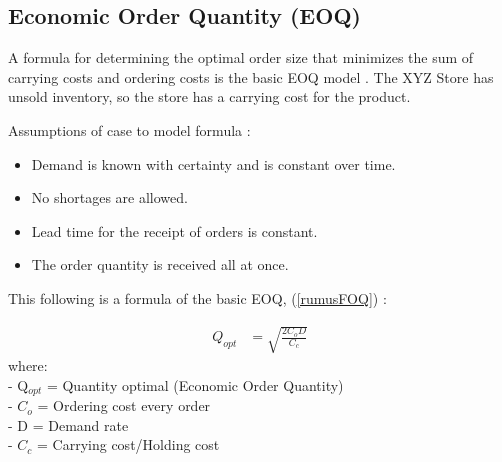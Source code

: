 \documentclass[12pt,a4paper,final]{iopart}
\begin{document}


\subsection{Economic Order Quantity (EOQ)}
A formula for determining the optimal order size that minimizes the sum of carrying costs and ordering costs is the basic EOQ model \cite{Rusell2011}. The XYZ Store has unsold inventory, so the store has a carrying cost for the product.

Assumptions of case to model formula \cite{Rusell2011}: 
\begin{itemize}
	\item Demand is known with certainty and is constant over time.
	\item No shortages are allowed.
	\item Lead time for the receipt of orders is constant.
	\item The order quantity is received all at once.
\end{itemize}
This following is a formula of the basic EOQ, (\ref{rumusFOQ}) :

\begin{eqnarray}
	\label{rumusFOQ}
	Q_{opt} &= \sqrt{\frac{2C_oD}{C_c}}
\end{eqnarray}
where:\\
- Q$_{opt}$ = Quantity optimal (Economic Order Quantity)\\
- $C_o$ = Ordering cost every order\\
- D = Demand rate\\
- $C_c$ = Carrying cost/Holding cost
\end{document}
